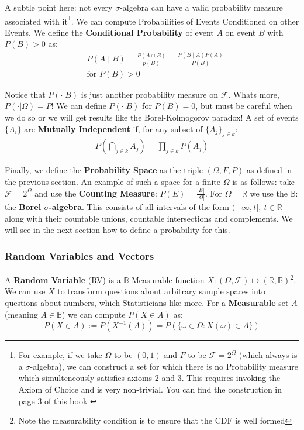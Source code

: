 \documentclass[]{article}
\theoremstyle{mattstyle}
\theoremstyle{definition}
\begin{document}
A subtle point here: not every $\sigma$-algebra can have a valid probability measure associated with it\footnote{For example, if we take $\Omega$ to be $(0,1)$ and $F$ to be $\mathcal{F}=2^{\Omega}$ (which always is a $\sigma$-algebra), we can construct a set for which there is no Probability measure which simulteneously satisfies axioms 2 and 3. This requires invoking the Axiom of Choice and is very non-trivial. You can find the construction in page 3 of this book \cite{rosenthalbook}}. We can compute Probabilities of Events Conditioned on other Events. We define the \textbf{Conditional Probability} of event \(A\) on event \(B\) with \(P(B) > 0\) as:
\begin{align*}
&P(A \mid B) = \frac{P(A \cap B)}{p(B)} = \frac{P(B \mid A)P(A)}{P(B)}\\
&\text{for $P(B) > 0$}
\end{align*}

Notice that $P(\cdot|B)$ is just another probability measure on \(\mathcal{F}\). Whats more, $P(\cdot|\Omega) = P$! We can define $P(\cdot|B)$ for $P(B)=0$, but must be careful when we do so or we will get results like the Borel-Kolmogorov paradox! A set of events \(\{A_i\}\) are \textbf{Mutually Independent} if, for any subset of \(\{A_j\}_{j\in k}\):
\begin{align*}
P \left( \bigcap_{j\in k} A_j \right) = \prod_{j\in k}P(A_j) 
\end{align*}

Finally, we define the \textbf{Probability Space} as the triple \( (\Omega, F, P)\) as defined in the previous section. An example of such a space for a finite $\Omega$ is as follows: take $\mathcal{F}=2^{\Omega}$ and use the \textbf{Counting Measure}: $P(E) = \frac{|E|}{|\Omega|}$. For $\Omega = \mathbb{R}$ we use the $\mathbb{B}$: the \textbf{Borel $\sigma$-algebra}. This consists of all intervals of the form $(-\infty, t], \ t \in \mathbb{R}$ along with their countable unions, countable intersections and complements. We will see in the next section how to define a probability for this.

\subsubsection{Random Variables and Vectors}

A \textbf{Random Variable} (RV) is a \(\mathbb{B}\)-Measurable function  \(X: (\Omega, \mathcal{F}) \mapsto (\mathbb{R},\mathbb{B}) \)\footnote{Note the measurability condition is to ensure that the CDF is well formed}. 
 We can use $X$ to transform questions about arbitrary sample spaces into questions about numbers, which Statisticians like more. For a \textbf{Measurable} set $A$ (meaning \( A \in \mathbb{B}\)) we can compute \( P(X \in A)\) as:
$$P(X \in A) := P(X^{-1}(A)) = P(\{ \omega \in \Omega : X(\omega) \in A \})$$
\end{document}
